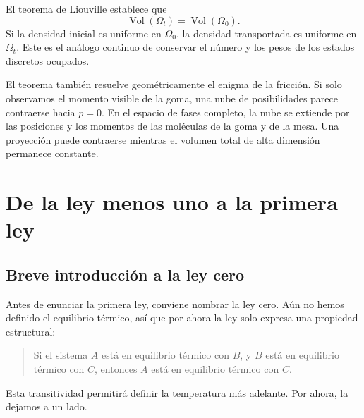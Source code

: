 El teorema de Liouville establece que
\begin{equation}
 \operatorname{Vol}(\Omega_t)
 =
 \operatorname{Vol}(\Omega_0).
 \label{eq:sm1-liouville-volume}
\end{equation}
Si la densidad inicial es uniforme en \(\Omega_0\), la densidad transportada es uniforme en \(\Omega_t\). Este es el análogo continuo de conservar el número y los pesos de los estados discretos ocupados.

El teorema también resuelve geométricamente el enigma de la fricción. Si solo observamos el momento visible de la goma, una nube de posibilidades parece contraerse hacia \(p=0\). En el espacio de fases completo, la nube se extiende por las posiciones y los momentos de las moléculas de la goma y de la mesa. Una proyección puede contraerse mientras el volumen total de alta dimensión permanece constante.

\begin{classroomqa}
\end{classroomqa}

\section{De la ley menos uno a la primera ley}

\subsection{Breve introducción a la ley cero}

Antes de enunciar la primera ley, conviene nombrar la ley cero. Aún no hemos definido el equilibrio térmico, así que por ahora la ley solo expresa una propiedad estructural:
\begin{quote}
Si el sistema \(A\) está en equilibrio térmico con \(B\), y \(B\) está en equilibrio térmico con \(C\), entonces \(A\) está en equilibrio térmico con \(C\).
\end{quote}
Esta transitividad permitirá definir la temperatura más adelante. Por ahora, la dejamos a un lado.


